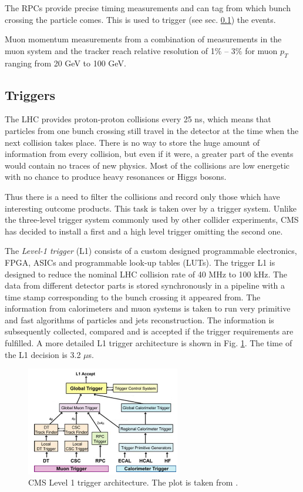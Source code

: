 The RPCs provide precise timing measurements and can tag from which bunch crossing the particle comes. This is used to trigger (see sec. \ref{sec:trig})
the events.

Muon momentum measurements from a combination of measurements in the muon system and the tracker reach relative resolution of 1$\%$ -- 3$\%$ for muon $p_{T}$
ranging from 20 GeV to 100 GeV.

\subsection{Triggers}\label{sec:trig}

The LHC provides proton-proton collisions every 25 ns, which means that particles from one bunch crossing still travel in the detector at 
the time when the next collision takes place. There is no way to store the huge amount of information from every collision, but even if it were,
a greater part of the events would contain no traces of new physics. Most of the collisions are low energetic with no chance
to produce heavy resonances or Higgs bosons.

Thus there is a need to filter the collisions and record only those which have interesting outcome products. This task is taken over by a trigger
system\cite{CMSatLHC}. Unlike the three-level trigger system commonly used by other collider experiments, CMS has decided to install a first and a high
level trigger omitting the second one.

The \textit{Level-1 trigger} (L1) consists of a custom designed programmable electronics, FPGA, ASICs and programmable look-up tables (LUTs).
The trigger L1 is designed to reduce the nominal LHC collision rate of 40 MHz to 100 kHz. The data from different detector parts is stored
synchronously in a pipeline with a time stamp corresponding to the bunch crossing it appeared from. The information from calorimeters and muon systems is taken to run very primitive
and fast algorithms of particles and jets reconstruction. The information is subsequently collected, compared and is accepted if the trigger
requirements are fulfilled. A more detailed L1 trigger architecture is shown in Fig. \ref{fig:trigA}. The time of the L1 decision is 3.2 $\mu$s. 

\begin{figure}[t]
  \centering
  \includegraphics[width=0.6\textwidth]{02_experimental_setup/plots/img_l1.png}
  \caption{CMS Level 1 trigger architecture. The plot is taken from \cite{CMSatLHC}.}
  \label{fig:trigA}
\end{figure}

